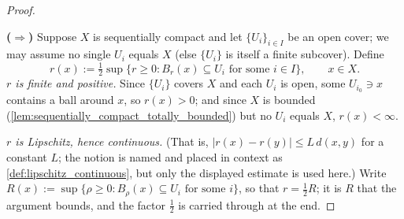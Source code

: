 \begin{proof}
\begin{center}
\end{center}

\textbf{($\Rightarrow$)} Suppose $X$ is sequentially compact and let $\{U_i\}_{i\in I}$ be an open
cover; we may assume no single $U_i$ equals $X$ (else $\{U_i\}$ is itself a finite subcover).
Define
\[r(x) := \tfrac12\sup\{r \geq 0 : B_r(x) \subseteq U_i \text{ for some } i \in I\}, \qquad x \in X.\]
\textit{$r$ is finite and positive.} Since $\{U_i\}$ covers $X$ and each $U_i$ is open, some
$U_{i_0} \ni x$ contains a ball around $x$, so $r(x) > 0$; and since $X$ is bounded
(\cref{lem:sequentially_compact_totally_bounded}) but no $U_i$ equals $X$, $r(x) < \infty$.

\textit{$r$ is Lipschitz, hence continuous.} (That is, $|r(x)-r(y)| \leq L\,d(x,y)$ for a
constant $L$; the notion is named and placed in context as \cref{def:lipschitz_continuous},
but only the displayed estimate is used here.) Write
$R(x) := \sup\{\rho \geq 0 : B_\rho(x) \subseteq U_i \text{ for some } i\}$, so that
$r = \tfrac12 R$; it is $R$ that the argument bounds, and the factor $\tfrac12$ is carried
through at the end.


\end{proof}
